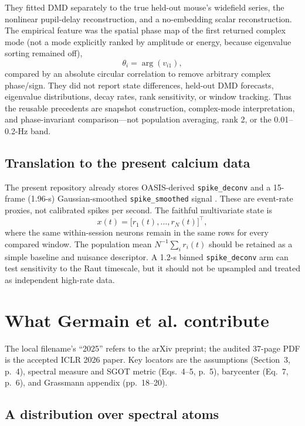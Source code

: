 \documentclass[11pt,a4paper]{article}
\begin{document}
They fitted DMD separately to the true held-out mouse's widefield series, the nonlinear pupil-delay reconstruction, and a no-embedding scalar reconstruction. The empirical feature was the spatial phase map of the first returned complex mode (not a mode explicitly ranked by amplitude or energy, because eigenvalue sorting remained off),
\begin{equation}
  \theta_i=\arg(v_{i1}),
\end{equation}
compared by an absolute circular correlation to remove arbitrary complex phase/sign. They did not report state differences, held-out DMD forecasts, eigenvalue distributions, decay rates, rank sensitivity, or window tracking. Thus the reusable precedents are snapshot construction, complex-mode interpretation, and phase-invariant comparison---not population averaging, rank 2, or the 0.01--0.2-Hz band.

\subsection{Translation to the present calcium data}

The present repository already stores OASIS-derived \texttt{spike\_deconv} and a 15-frame (1.96-s) Gaussian-smoothed \texttt{spike\_smoothed} signal \citep{friedrich2017,kiyooka2026}. These are event-rate proxies, not calibrated spikes per second. The faithful multivariate state is
\begin{equation}
  x(t)=\big[r_1(t),\ldots,r_N(t)\big]^\top,
\end{equation}
where the same within-session neurons remain in the same rows for every compared window. The population mean $N^{-1}\sum_i r_i(t)$ should be retained as a simple baseline and nuisance descriptor. A 1.2-s binned \texttt{spike\_deconv} arm can test sensitivity to the Raut timescale, but it should not be upsampled and treated as independent high-rate data.

\section{What Germain et al. contribute}

The local filename's ``2025'' refers to the arXiv preprint; the audited 37-page PDF is the accepted ICLR 2026 paper. Key locators are the assumptions (Section~3, p.~4), spectral measure and SGOT metric (Eqs.~4--5, p.~5), barycenter (Eq.~7, p.~6), and Grassmann appendix (pp.~18--20).

\subsection{A distribution over spectral atoms}
\end{document}
